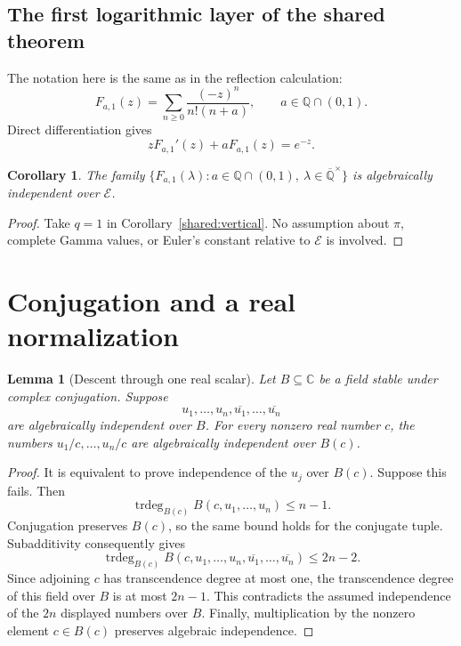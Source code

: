 \documentclass[11pt,a4paper]{article}
\newcommand{\Qbar}{\overline{\mathbb Q}}
\newcommand{\E}{\mathcal E}
\newtheorem{lemma}[theorem]{Lemma}
\newtheorem{corollary}[theorem]{Corollary}
\theoremstyle{definition}
\theoremstyle{remark}
\numberwithin{equation}{section}
\begin{document}
\subsection{The first logarithmic layer of the shared theorem}
The notation here is the same as in the reflection calculation:
\[
 F_{a,1}(z)=\sum_{n\ge0}\frac{(-z)^n}{n!(n+a)},\qquad
 a\in\mathbb Q\cap(0,1).
\]
Direct differentiation gives
\begin{equation}\label{norm:eq:ode}
 zF_{a,1}'(z)+aF_{a,1}(z)=e^{-z}.
\end{equation}
\begin{corollary}\label{norm:thm:arithmetic}
The family $\{F_{a,1}(\lambda):a\in\mathbb Q\cap(0,1),\
\lambda\in\Qbar^\times\}$ is algebraically independent over $\E$.
\end{corollary}
\begin{proof}
Take $q=1$ in Corollary~\ref{shared:vertical}. No assumption about
$\pi$, complete Gamma values, or Euler's constant relative to $\E$
is involved.
\end{proof}

\section{Conjugation and a real normalization}
\begin{lemma}[Descent through one real scalar]\label{norm:lem:conjugation-descent}
Let $B\subseteq\mathbb C$ be a field stable under complex conjugation.
Suppose
\[
 u_1,\ldots,u_n,\overline{u_1},\ldots,\overline{u_n}
\]
are algebraically independent over $B$.  For every nonzero real number
$c$, the numbers $u_1/c,\ldots,u_n/c$ are algebraically independent over
$B(c)$.
\end{lemma}

\begin{proof}
It is equivalent to prove independence of the $u_j$ over $B(c)$.
Suppose this fails.  Then
\[
 \operatorname{trdeg}_{B(c)}B(c,u_1,\ldots,u_n)\leq n-1.
\]
Conjugation preserves $B(c)$, so the same bound holds for the conjugate
tuple.  Subadditivity consequently gives
\[
 \operatorname{trdeg}_{B(c)}
 B(c,u_1,\ldots,u_n,\overline{u_1},\ldots,\overline{u_n})
 \leq2n-2.
\]
Since adjoining $c$ has transcendence degree at most one, the
transcendence degree of this field over $B$ is at most $2n-1$.
This contradicts the assumed independence of the $2n$ displayed
numbers over $B$.  Finally, multiplication by the nonzero element
$c\in B(c)$ preserves algebraic independence.
\end{proof}
\end{document}
